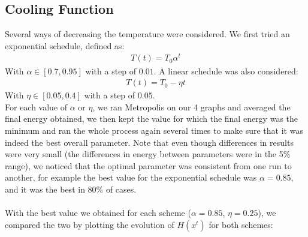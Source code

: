 \documentclass[a4paper]{article}
\begin{document}
\subsection{Cooling Function}
Several ways of decreasing the temperature were considered. We first tried an exponential schedule, defined as:
\begin{align*}
T(t) = T_0\alpha^{t}
\end{align*}
With $\alpha \in [0.7,0.95]$ with a step of $0.01$. A linear schedule was also considered:
\begin{align*}
T(t) = T_0 - \eta t
\end{align*}
With $\eta \in [0.05,0.4]$ with a step of $0.05$.\\
For each value of $\alpha$ or $\eta$, we ran Metropolis on our 4 graphs and averaged the final energy obtained, we then kept the value for which the final energy was the minimum and ran the whole process again several times to make sure that it was indeed the best overall parameter. Note that even though differences in results were very small (the differences in energy between parameters were in the 5\% range), we noticed that the optimal parameter was consistent from one run to another, for example the best value for the exponential schedule was $\alpha = 0.85$, and it was the best in 80\% of cases.\\\\
With the best value we obtained for each scheme ($\alpha = 0.85$, $\eta = 0.25$), we compared the two by plotting the evolution of $H(x^t)$ for both schemes:
\end{document}
